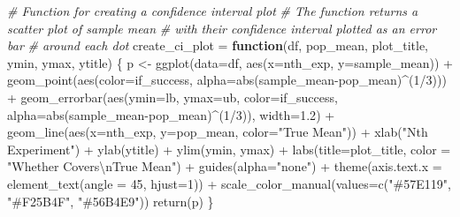 \documentclass[
]{article}
\newenvironment{Shaded}{\begin{snugshade}}{\end{snugshade}}
\newcommand{\AttributeTok}[1]{\textcolor[rgb]{0.77,0.63,0.00}{#1}}
\newcommand{\CommentTok}[1]{\textcolor[rgb]{0.56,0.35,0.01}{\textit{#1}}}
\newcommand{\ControlFlowTok}[1]{\textcolor[rgb]{0.13,0.29,0.53}{\textbf{#1}}}
\newcommand{\DecValTok}[1]{\textcolor[rgb]{0.00,0.00,0.81}{#1}}
\newcommand{\FloatTok}[1]{\textcolor[rgb]{0.00,0.00,0.81}{#1}}
\newcommand{\FunctionTok}[1]{\textcolor[rgb]{0.00,0.00,0.00}{#1}}
\newcommand{\NormalTok}[1]{#1}
\newcommand{\OtherTok}[1]{\textcolor[rgb]{0.56,0.35,0.01}{#1}}
\newcommand{\SpecialCharTok}[1]{\textcolor[rgb]{0.00,0.00,0.00}{#1}}
\newcommand{\StringTok}[1]{\textcolor[rgb]{0.31,0.60,0.02}{#1}}
\begin{document}
\begin{Shaded}
\begin{Highlighting}[]
\CommentTok{\# Function for creating a confidence interval plot}
\CommentTok{\# The function returns a scatter plot of sample mean}
\CommentTok{\# with their confidence interval plotted as an error bar}
\CommentTok{\# around each dot}
\NormalTok{create\_ci\_plot }\OtherTok{=} \ControlFlowTok{function}\NormalTok{(df, pop\_mean, plot\_title, ymin, ymax, ytitle) \{}
\NormalTok{  p }\OtherTok{\textless{}{-}} \FunctionTok{ggplot}\NormalTok{(}\AttributeTok{data=}\NormalTok{df, }\FunctionTok{aes}\NormalTok{(}\AttributeTok{x=}\NormalTok{nth\_exp, }\AttributeTok{y=}\NormalTok{sample\_mean)) }\SpecialCharTok{+}
      \FunctionTok{geom\_point}\NormalTok{(}\FunctionTok{aes}\NormalTok{(}\AttributeTok{color=}\NormalTok{if\_success, }
                     \AttributeTok{alpha=}\FunctionTok{abs}\NormalTok{(sample\_mean}\SpecialCharTok{{-}}\NormalTok{pop\_mean)}\SpecialCharTok{\^{}}\NormalTok{(}\DecValTok{1}\SpecialCharTok{/}\DecValTok{3}\NormalTok{))) }\SpecialCharTok{+}
      \FunctionTok{geom\_errorbar}\NormalTok{(}\FunctionTok{aes}\NormalTok{(}\AttributeTok{ymin=}\NormalTok{lb, }\AttributeTok{ymax=}\NormalTok{ub, }\AttributeTok{color=}\NormalTok{if\_success,}
                        \AttributeTok{alpha=}\FunctionTok{abs}\NormalTok{(sample\_mean}\SpecialCharTok{{-}}\NormalTok{pop\_mean)}\SpecialCharTok{\^{}}\NormalTok{(}\DecValTok{1}\SpecialCharTok{/}\DecValTok{3}\NormalTok{)), }
                    \AttributeTok{width=}\FloatTok{1.2}\NormalTok{) }\SpecialCharTok{+}
      \FunctionTok{geom\_line}\NormalTok{(}\FunctionTok{aes}\NormalTok{(}\AttributeTok{x=}\NormalTok{nth\_exp, }\AttributeTok{y=}\NormalTok{pop\_mean, }\AttributeTok{color=}\StringTok{"True Mean"}\NormalTok{)) }\SpecialCharTok{+}
      \FunctionTok{xlab}\NormalTok{(}\StringTok{"Nth Experiment"}\NormalTok{) }\SpecialCharTok{+}
      \FunctionTok{ylab}\NormalTok{(ytitle) }\SpecialCharTok{+}
      \FunctionTok{ylim}\NormalTok{(ymin, ymax) }\SpecialCharTok{+}
      \FunctionTok{labs}\NormalTok{(}\AttributeTok{title=}\NormalTok{plot\_title,}
           \AttributeTok{color =} \StringTok{"Whether Covers}\SpecialCharTok{\textbackslash{}n}\StringTok{True Mean"}\NormalTok{) }\SpecialCharTok{+}
      \FunctionTok{guides}\NormalTok{(}\AttributeTok{alpha=}\StringTok{"none"}\NormalTok{) }\SpecialCharTok{+}
      \FunctionTok{theme}\NormalTok{(}\AttributeTok{axis.text.x =} \FunctionTok{element\_text}\NormalTok{(}\AttributeTok{angle =} \DecValTok{45}\NormalTok{, }\AttributeTok{hjust=}\DecValTok{1}\NormalTok{)) }\SpecialCharTok{+}
      \FunctionTok{scale\_color\_manual}\NormalTok{(}\AttributeTok{values=}\FunctionTok{c}\NormalTok{(}\StringTok{"\#57E119"}\NormalTok{, }\StringTok{"\#F25B4F"}\NormalTok{, }\StringTok{"\#56B4E9"}\NormalTok{))}
  \FunctionTok{return}\NormalTok{(p)}
\NormalTok{\}}


\end{Highlighting}
\end{Shaded}
\end{document}

